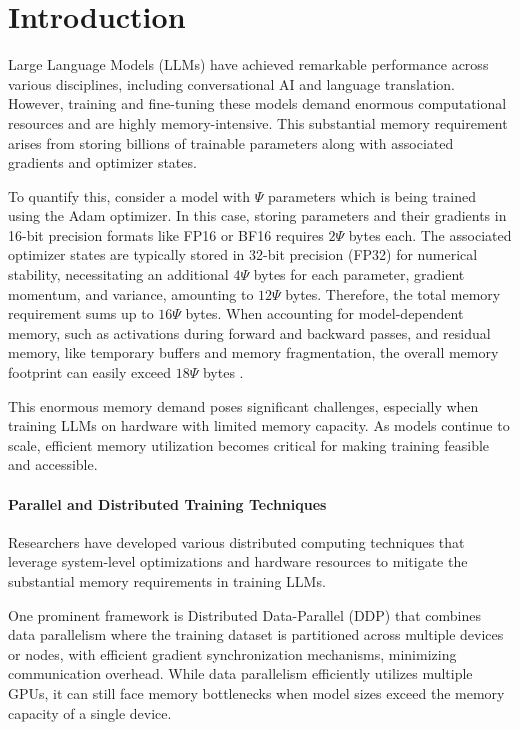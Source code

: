 
\vspace{-8mm}
\section{Introduction}
Large Language Models (LLMs) have achieved remarkable performance across various disciplines, including conversational AI and language translation. However, training and fine-tuning these models demand enormous computational resources and are highly memory-intensive. This substantial memory requirement arises from storing billions of trainable parameters along with associated gradients and optimizer states.

To quantify this, consider a model with $\Psi$ parameters which is being trained using the Adam optimizer. In this case, storing parameters and their gradients in 16-bit precision formats like FP16 or BF16 requires $2\Psi$ bytes each. The associated optimizer states are typically stored in 32-bit precision (FP32) for numerical stability, necessitating an additional $4\Psi$ bytes for each parameter, gradient momentum, and variance, amounting to $12\Psi$ bytes. Therefore, the total memory requirement sums up to $16\Psi$ bytes. When accounting for model-dependent memory, such as activations during forward and backward passes, and residual memory, like temporary buffers and memory fragmentation, the overall memory footprint can easily exceed $18\Psi$ bytes \citep{raffelExploringLimitsTransfer2020,touvronLlamaOpenFoundation2023,chowdheryPaLMScalingLanguage2022}.

This enormous memory demand poses significant challenges, especially when training LLMs on hardware with limited memory capacity. As models continue to scale, efficient memory utilization becomes critical for making training feasible and accessible.

\paragraph{Parallel and Distributed Training Techniques}
Researchers have developed various distributed computing techniques that leverage system-level optimizations and hardware resources to mitigate the substantial memory requirements in training LLMs.

One prominent framework is Distributed Data-Parallel (DDP) that combines data parallelism where the training dataset is partitioned across multiple devices or nodes, with efficient gradient synchronization mechanisms, minimizing communication overhead. While data parallelism efficiently utilizes multiple GPUs, it can still face memory bottlenecks when model sizes exceed the memory capacity of a single device.

